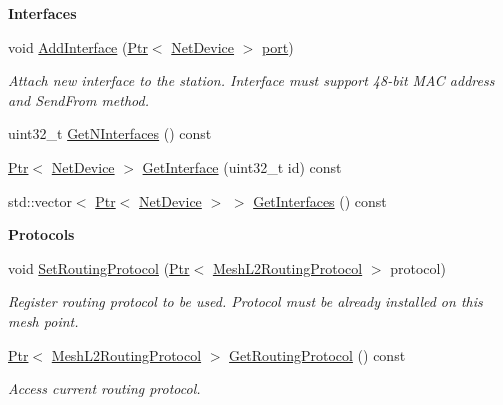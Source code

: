 \begin{Indent}{\bf Interfaces}\par
\begin{DoxyCompactItemize}
\item 
void \hyperlink{classns3_1_1MeshPointDevice_a0001ebec0a10fc9cf05dd6da958a7e98}{Add\+Interface} (\hyperlink{classns3_1_1Ptr}{Ptr}$<$ \hyperlink{classns3_1_1NetDevice}{Net\+Device} $>$ \hyperlink{visualizer-ideas_8txt_a21ff1c530daf8435e00048b7fc2c58e3}{port})
\begin{DoxyCompactList}\small\item\em Attach new interface to the station. Interface must support 48-\/bit M\+AC address and Send\+From method. \end{DoxyCompactList}\item 
uint32\+\_\+t \hyperlink{classns3_1_1MeshPointDevice_ada5a23b0bdd27cbf6acfdc987d4195d3}{Get\+N\+Interfaces} () const 
\item 
\hyperlink{classns3_1_1Ptr}{Ptr}$<$ \hyperlink{classns3_1_1NetDevice}{Net\+Device} $>$ \hyperlink{classns3_1_1MeshPointDevice_a713a8775a919a65821d588e22d3a69dd}{Get\+Interface} (uint32\+\_\+t id) const 
\item 
std\+::vector$<$ \hyperlink{classns3_1_1Ptr}{Ptr}$<$ \hyperlink{classns3_1_1NetDevice}{Net\+Device} $>$ $>$ \hyperlink{classns3_1_1MeshPointDevice_ab4c61357a8795c37dd042c560cd12b8f}{Get\+Interfaces} () const 
\end{DoxyCompactItemize}
\end{Indent}
\begin{Indent}{\bf Protocols}\par
\begin{DoxyCompactItemize}
\item 
void \hyperlink{classns3_1_1MeshPointDevice_a2f487dde5dd7b11b13ad8617c7172d16}{Set\+Routing\+Protocol} (\hyperlink{classns3_1_1Ptr}{Ptr}$<$ \hyperlink{classns3_1_1MeshL2RoutingProtocol}{Mesh\+L2\+Routing\+Protocol} $>$ protocol)
\begin{DoxyCompactList}\small\item\em Register routing protocol to be used. Protocol must be already installed on this mesh point. \end{DoxyCompactList}\item 
\hyperlink{classns3_1_1Ptr}{Ptr}$<$ \hyperlink{classns3_1_1MeshL2RoutingProtocol}{Mesh\+L2\+Routing\+Protocol} $>$ \hyperlink{classns3_1_1MeshPointDevice_aefd9678ce885b9dbc7b1aa099e4ebdbe}{Get\+Routing\+Protocol} () const 
\begin{DoxyCompactList}\small\item\em Access current routing protocol. \end{DoxyCompactList}\end{DoxyCompactItemize}
\end{Indent}
